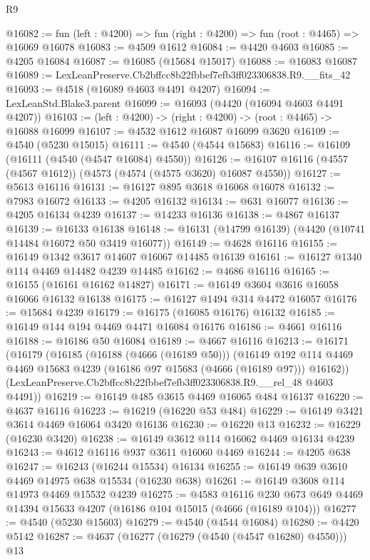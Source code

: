 \begin{lexlean}{R9}
\begin{coremodule}
@16082 := fun (left : @4200) => fun (right : @4200) => fun (root : @4465) => @16069 @16078
@16083 := @4509 @1612
@16084 := @4420 @4603
@16085 := @4205 @16084
@16087 := @16085 (@15684 @15017)
@16088 := @16083 @16087
@16089 := LexLeanPreserve.Cb2bffcc8b22fbbef7efb3ff023306838.R9.__fits_42
@16093 := @4518 (@16089 @4603 @4491 @4207)
@16094 := LexLeanStd.Blake3.parent
@16099 := @16093 (@4420 (@16094 @4603 @4491 @4207))
@16103 := (left : @4200) -> (right : @4200) -> (root : @4465) -> @16088 @16099
@16107 := @4532 @1612 @16087 @16099 @3620
@16109 := @4540 (@5230 @15015)
@16111 := @4540 (@4544 @15683)
@16116 := @16109 (@16111 (@4540 (@4547 @16084) @4550))
@16126 := @16107 @16116 (@4557 (@4567 @1612)) (@4573 (@4574 (@4575 @3620) @16087 @4550))
@16127 := @5613 @16116
@16131 := @16127 @895 @3618 @16068 @16078
@16132 := @7983 @16072
@16133 := @4205 @16132
@16134 := @631 @16077
@16136 := @4205 @16134 @4239
@16137 := @14233 @16136
@16138 := @4867 @16137
@16139 := @16133 @16138
@16148 := @16131 (@14799 @16139) (@4420 (@10741 @14484 @16072 @50 @3419 @16077))
@16149 := @4628 @16116
@16155 := @16149 @1342 @3617 @14607 @16067 @14485 @16139
@16161 := @16127 @1340 @114 @4469 @14482 @4239 @14485
@16162 := @4686 @16116
@16165 := @16155 (@16161 @16162 @14827)
@16171 := @16149 @3604 @3616 @16058 @16066 @16132 @16138
@16175 := @16127 @1494 @314 @4472 @16057
@16176 := @15684 @4239
@16179 := @16175 (@16085 @16176) @16132
@16185 := @16149 @144 @194 @4469 @4471 @16084 @16176
@16186 := @4661 @16116
@16188 := @16186 @50 @16084
@16189 := @4667 @16116
@16213 := @16171
    (@16179
      (@16185
        (@16188 (@4666 (@16189 @50)))
        (@16149 @192 @114 @4469 @4469 @15683 @4239 (@16186 @97 @15683 (@4666 (@16189 @97))) @16162))
      (LexLeanPreserve.Cb2bffcc8b22fbbef7efb3ff023306838.R9.__rel_48 @4603 @4491))
@16219 := @16149 @485 @3615 @4469 @16065 @484 @16137
@16220 := @4637 @16116
@16223 := @16219 (@16220 @53 @484)
@16229 := @16149 @3421 @3614 @4469 @16064 @3420 @16136
@16230 := @16220 @13
@16232 := @16229 (@16230 @3420)
@16238 := @16149 @3612 @114 @16062 @4469 @16134 @4239
@16243 := @4612 @16116 @937 @3611 @16060 @4469
@16244 := @4205 @638
@16247 := @16243 (@16244 @15534) @16134
@16255 := @16149 @639 @3610 @4469 @14975 @638 @15534 (@16230 @638)
@16261 := @16149 @3608 @114 @14973 @4469 @15532 @4239
@16275 := @4583
    @16116
    @230
    @673
    @649
    @4469
    @14394
    @15633
    @4207
    (@16186 @104 @15015 (@4666 (@16189 @104)))
@16277 := @4540 (@5230 @15603)
@16279 := @4540 (@4544 @16084)
@16280 := @4420 @5142
@16287 := @4637 (@16277 (@16279 (@4540 (@4547 @16280) @4550))) @13

\end{coremodule}
\end{lexlean}
